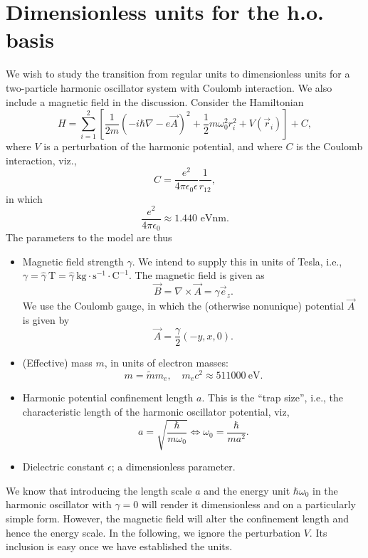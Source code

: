 \documentclass{article}
\begin{document}
\section*{Dimensionless units for the h.o. basis}

We wish to study the transition from regular units to dimensionless
units for a two-particle harmonic oscillator system with Coulomb
interaction. We also include a magnetic field in the discussion. Consider the
Hamiltonian
\[ H = \sum_{i=1}^2 \left[\frac{1}{2m}\left(-i\hbar\nabla - e\vec{A}\right)^2 +
\frac{1}{2}m\omega_0^2 r_i^2 + V(\vec{r}_i) \right] + C, \] where $V$
is a perturbation of the harmonic potential, and where $C$ is the Coulomb
interaction, viz.,
\[ C = \frac{e^2}{4\pi\epsilon_0\epsilon}\frac{1}{r_{12}}, \]
in which
\[ \frac{e^2}{4\pi\epsilon_0} \approx 1.440 \text{ eVnm}. \]
The parameters to the model are thus
\begin{itemize}
\item Magnetic field strength $\gamma$. We intend to supply this in
  units of Tesla, i.e., $\gamma = \hat{\gamma}\:\mathrm{T} = \hat{\gamma}\:\mathrm{kg\cdot
  s^{-1} \cdot C^{-1}}$.
The magnetic field is given as
\[ \vec{B} = \nabla\times \vec{A} = \gamma\vec{e}_z. \]
We use the Coulomb gauge, in which the (otherwise nonunique) potential
$\vec{A}$ is given by
\[ \vec{A} = \frac{\gamma}{2}(-y,x,0). \]
\item (Effective) mass $m$, in units of electron masses:
\[ m = \tilde{m}m_e, \quad m_ec^2\approx 511000 \:\mathrm{eV}. \]
\item Harmonic potential confinement length $a$. This is the ``trap
  size'', i.e., the characteristic length of the harmonic oscillator
  potential, viz,
\[ a = \sqrt{\frac{\hbar}{m\omega_0}} \Leftrightarrow \omega_0 =
  \frac{\hbar}{ma^2}. \]
\item Dielectric constant $\epsilon$; a dimensionless parameter.
\end{itemize}

We know that introducing the length scale $a$ and the energy unit
$\hbar\omega_0$ in the harmonic oscillator with $\gamma=0$ will render it
dimensionless and on a particularly simple form. However, the magnetic
field will alter the confinement length and hence the energy
scale. In the following, we ignore the perturbation $V$. Its inclusion is
easy once we have established the units.
\end{document}
